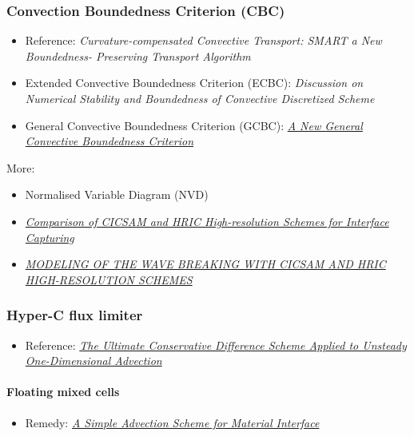 \documentclass[]{report}
\begin{document}
\subsubsection{Convection Boundedness Criterion (CBC)}

\begin{itemize}
    \item Reference: \textit{Curvature-compensated Convective Transport: SMART a New Boundedness- Preserving Transport Algorithm}
    \item Extended Convective Boundedness Criterion (ECBC): \textit{Discussion on Numerical Stability and Boundedness of Convective Discretized Scheme}
    \item General Convective Boundedness Criterion (GCBC): \textit{\href{http://gr.xjtu.edu.cn:8080/upload/PUB.1673.4/Wei_NHT.pdf}{A New General Convective Boundedness Criterion}}
\end{itemize}

More:
\begin{itemize}
    \item Normalised Variable Diagram (NVD)
    \item \textit{\href{http://warminski.pollub.plwww.ptmts.org.pl/Waclaw-Koron-2-08.pdf}{Comparison of CICSAM and HRIC High-resolution Schemes for Interface Capturing}}
    \item \textit{\href{http://proceedings.fyper.com/eccomascfd2006/documents/85.pdf}{MODELING OF THE WAVE BREAKING WITH CICSAM AND HRIC HIGH-RESOLUTION SCHEMES}}
\end{itemize}

\subsubsection{Hyper-C flux limiter}

\begin{itemize}
    \item Reference: \textit{\href{http://www.water.tkk.fi/wr/kurssit/Yhd-12.112/TVD1.pdf}{The Ultimate Conservative Difference Scheme Applied to Unsteady One-Dimensional Advection}}
\end{itemize}

\paragraph{Floating mixed cells}

\begin{itemize}
    \item Remedy: \textit{\href{https://e-reports-ext.llnl.gov/pdf/245038.pdf}{A Simple Advection Scheme for Material Interface}}
\end{itemize}
\end{document}
